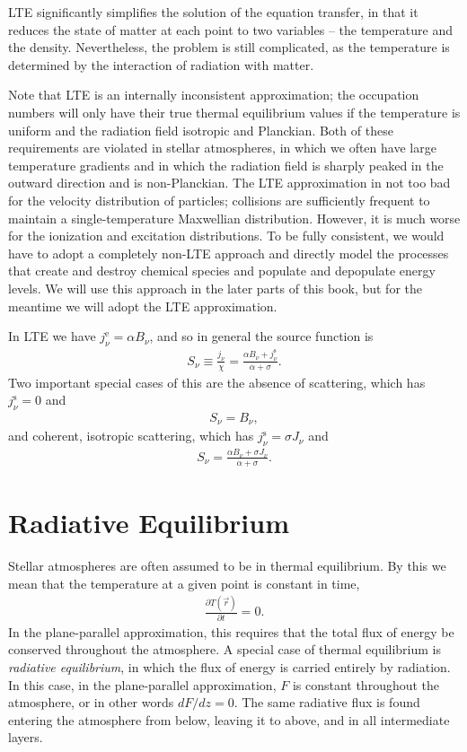 LTE significantly simplifies the solution of the equation
transfer, in that it reduces the state of matter at each
point to two variables -- the temperature and the density.
Nevertheless, the problem is still complicated, as the
temperature is determined by the interaction of radiation
with matter.

Note that LTE is an internally inconsistent approximation;
the occupation numbers will only have their true thermal
equilibrium values if the temperature is uniform and the
radiation field isotropic and Planckian. Both of these
requirements are violated in stellar atmospheres, in which
we often have large temperature gradients and in which the
radiation field is sharply peaked in the outward direction
and is non-Planckian. The LTE approximation in not too bad
for the velocity distribution of particles; collisions are
sufficiently frequent to maintain a single-temperature
Maxwellian distribution. However, it is much worse for the
ionization and excitation distributions. To be fully consistent, we would
have to adopt a completely non-LTE approach and directly
model the processes that create and destroy chemical species
and populate and depopulate energy levels. We will use this
approach in the later parts of this book, but for the
meantime we will adopt the LTE approximation.

In LTE we have $j_\nu^\mathrm{e} = \alpha B_\nu$, and so in general
the source function is 
\begin{align}
S_\nu \equiv \frac{j_\nu}{\chi} = \frac{\alpha B_\nu + j_\nu^\mathrm{s}}{\alpha + \sigma}.
\end{align}
Two important special cases of this are the absence of scattering, which
has $j_\nu^\mathrm{s} = 0$ and
\begin{align}
S_\nu = B_\nu,
\end{align}
and coherent, isotropic scattering, which has $j_\nu^\mathrm{s} =
\sigma J_\nu$ and 
\begin{align}
S_\nu = \frac{\alpha B_\nu + \sigma J_\nu}{\alpha +
\sigma}.
\label{equation-lte-and-coherent-and-isotropic-scattering}
\end{align}

\section{Radiative Equilibrium}

Stellar atmospheres are often assumed to be in
thermal equilibrium. By this we mean that the temperature at a given point is constant in time,
\begin{align}
\frac{\partial T(\vec r)}{\partial t} = 0.
\end{align}
In the plane-parallel approximation, this requires
that the total flux of energy be conserved throughout the atmosphere. A
special case of thermal equilibrium is \emph{radiative equilibrium}, in
which the flux of energy is carried entirely by radiation. In this case, in the
plane-parallel approximation, $F$ is constant throughout the atmosphere,
or in other words $dF/dz = 0$. The same radiative flux is found
entering the atmosphere from below, leaving it to above, and in all
intermediate layers.

